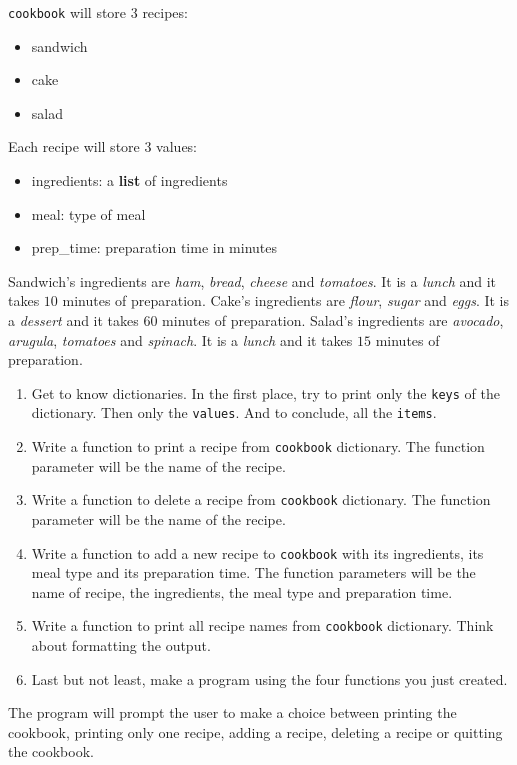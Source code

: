 \documentclass{42-en}
\begin{document}
\begin{42console}
\texttt{cookbook} will store 3 recipes:
\begin{itemize}
	\item sandwich
	\item cake
	\item salad
\end{itemize}

Each recipe will store 3 values:
\begin{itemize}
	\item ingredients: a \textbf{list} of ingredients
	\item meal: type of meal
	\item prep\_time: preparation time in minutes
\end{itemize}

Sandwich's ingredients are \textit{ham}, \textit{bread}, \textit{cheese} and \textit{tomatoes}.
It is a \textit{lunch} and it takes $10$ minutes of preparation.
Cake's ingredients are \textit{flour}, \textit{sugar} and \textit{eggs}.
It is a \textit{dessert} and it takes $60$ minutes of preparation.
Salad's ingredients are \textit{avocado}, \textit{arugula}, \textit{tomatoes} and \textit{spinach}.
It is a \textit{lunch} and it takes $15$ minutes of preparation.

\begin{enumerate}
	\item Get to know dictionaries. In the first place, try to print only the \texttt{keys} of the dictionary. Then only the \texttt{values}. And to conclude, all the \texttt{items}.
	\item Write a function to print a recipe from \texttt{cookbook} dictionary. The function parameter will be the name of the recipe.
	\item Write a function to delete a recipe from \texttt{cookbook} dictionary. The function parameter will be the name of the recipe.
	\item Write a function to add a new recipe to \texttt{cookbook} with its ingredients, its meal type and its preparation time. The function parameters will be the name of recipe, the ingredients, the meal type and preparation time.
	\item Write a function to print all recipe names from \texttt{cookbook} dictionary. Think about formatting the output.
	\item Last but not least, make a program using the four functions you just created.
\end{enumerate}

The program will prompt the user to make a choice between printing the cookbook, printing only one recipe, adding a recipe, deleting a recipe or quitting the cookbook.



\end{42console}
\end{document}
